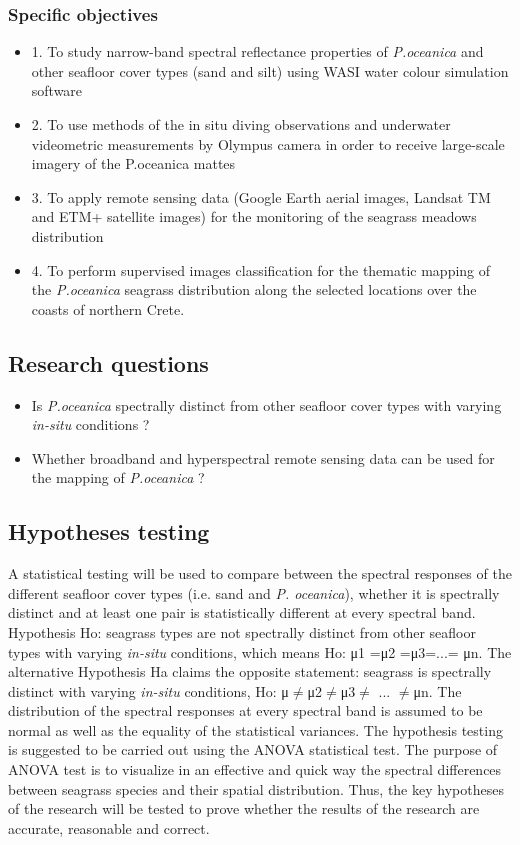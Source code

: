\documentclass[10pt, a4paper]{article}
\begin{document}
\subsubsection{Specific objectives}
	\begin{itemize}	
		\item[]1.	To study narrow-band spectral reflectance properties of \textit{P.oceanica} and other seafloor cover types (sand and silt) using WASI water colour simulation software 
		\item[]2.	To use methods of the in situ diving observations and underwater videometric measurements by Olympus camera in order to receive large-scale imagery of the P.oceanica mattes 
		\item[]3.	To apply remote sensing data (Google Earth aerial images, Landsat TM and ETM+ satellite images) for the monitoring of the seagrass meadows distribution 
		\item[]4.	To perform supervised images classification for the thematic mapping of the \textit{P.oceanica} seagrass distribution along the selected locations over the coasts of northern Crete. 
	\end{itemize}


\subsection{Research questions}
	\begin{itemize}	
		\item Is \textit{P.oceanica} spectrally distinct from other seafloor cover types with varying \textit{in-situ} conditions ?
		\item Whether broadband and hyperspectral remote sensing data can be used for the mapping of \textit{P.oceanica} ?
	\end{itemize}

\subsection{Hypotheses testing}
A statistical testing will be used to compare between the spectral responses of the different seafloor cover types (i.e. sand and \textit{P. oceanica}),
 whether it is spectrally distinct and at least one pair is statistically different at every spectral
band.
Hypothesis Ho: seagrass types are not spectrally distinct from other seafloor types with
varying \textit{in-situ} conditions, which means
Ho: μ1 =μ2 =μ3=...= μn.
The alternative Hypothesis Ha claims the opposite statement: seagrass is spectrally
distinct with varying \textit{in-situ} conditions, Ho: μ$\neq$μ2$\neq$μ3$\neq$ ... $\neq$μn.
The distribution of the spectral responses at every spectral band is assumed to be normal as well as
the equality of the statistical variances.
The hypothesis testing is suggested to be carried out using the ANOVA statistical test. The purpose of
ANOVA test is to visualize in an effective and quick way the spectral differences between seagrass
species and their spatial distribution. Thus, the key hypotheses of the research will be tested to prove
whether the results of the research are accurate, reasonable and correct.
\end{document}
